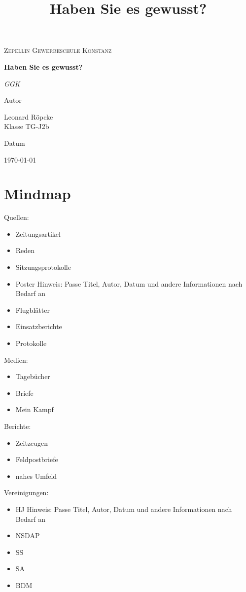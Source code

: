 \documentclass{article}
\title{Haben Sie es gewusst?}
\newcommand{\AuthorName}{Leonard Röpcke\\Klasse TG-J2b}
\newcommand{\Institute}{Zepellin Gewerbeschule Konstanz}
\newcommand{\Subtitle}{GGK}
\newcommand{\MyDate}{\today}
\begin{document}
\begin{titlepage}
  \centering
  {\scshape\LARGE \Institute \par}
  \vspace{2.5cm}
  {\huge\bfseries Haben Sie es gewusst?\par}
  \vspace{0.8cm}
  {\Large\itshape \Subtitle \par}
  \vfill
  {\Large Autor\par}
  {\Large \AuthorName \par}
  \vspace{1cm}
  {\Large Datum\par}
  {\Large \MyDate \par}
  \vfill
  \vspace{1cm}
  {\small }
\end{titlepage}
\tableofcontents
\newpage

\section{Mindmap}
Quellen:
\begin{itemize}
    \item Zeitungsartikel
    \item Reden
    \item Sitzungsprotokolle
    \item Poster Hinweis: Passe Titel, Autor, Datum und andere Informationen nach Bedarf an
    \item Flugblätter
    \item Einsatzberichte
    \item Protokolle
\end{itemize}
Medien:
\begin{itemize}
    \item Tagebücher
    \item Briefe
    \item Mein Kampf
\end{itemize}
Berichte:
\begin{itemize}
    \item Zeitzeugen
    \item Feldpostbriefe
    \item nahes Umfeld
\end{itemize}
Vereinigungen:
\begin{itemize}
    \item HJ Hinweis: Passe Titel, Autor, Datum und andere Informationen nach Bedarf an
    \item NSDAP
    \item SS
    \item SA
    \item BDM
\end{itemize}
\end{document}
